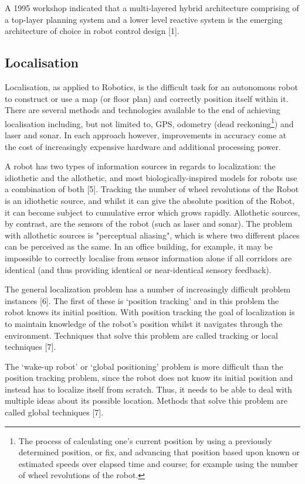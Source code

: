 \documentclass{article}
\begin{document}
A 1995 workshop indicated that a multi-layered hybrid architecture comprising of a top-layer planning system and a lower level reactive system is the emerging architecture of choice in robot control design [1].

	\subsection{Localisation}
	Localisation, as applied to Robotics, is the difficult task for an autonomous robot to construct or use a map (or floor plan) and correctly position itself within it. There are several methods and technologies available to the end of achieving localisation including, but not limited to, GPS, odometry (dead reckoning\footnote{The process of calculating one's current position by using a previously determined position, or fix, and advancing that position based upon known or estimated speeds over elapsed time and course; for example using the number of wheel revolutions of the robot.}) and laser and sonar. In each approach however, improvements in accuracy come at the cost of increasingly expensive hardware and  additional processing power. 

A robot has two types of information sources in regards to localization: the idiothetic and the allothetic, and most biologically-inspired models for robots use a combination of both [5]. Tracking the number of wheel revolutions of the Robot is an idiothetic source, and whilst it can give the absolute position of the Robot, it can become subject to cumulative error which grows rapidly. Allothetic sources, by contrast, are the sensors of the robot (such as laser and sonar). The problem with allothetic sources  is "perceptual aliasing", which is where two different places can be perceived as the same. In an office building, for example, it may be impossible to correctly localise from sensor information alone if all corridors are identical (and thus providing identical or near-identical sensory feedback).

The general localization problem has a number of increasingly difficult problem instances [6]. The first of these is ‘position tracking’ and in this problem the robot knows its initial position. With position tracking the goal of localization is to maintain knowledge of the robot’s position whilst it navigates through the environment.  Techniques that solve this problem are called tracking or local techniques [7]. 

The ‘wake-up robot’ or ‘global positioning’ problem is more difficult than the position tracking problem, since the robot does not know its initial position and instead has to localize itself from scratch. Thus, it needs to be able to deal with multiple ideas about its possible location. Methods that solve this problem are called global techniques [7]. 
\end{document}
